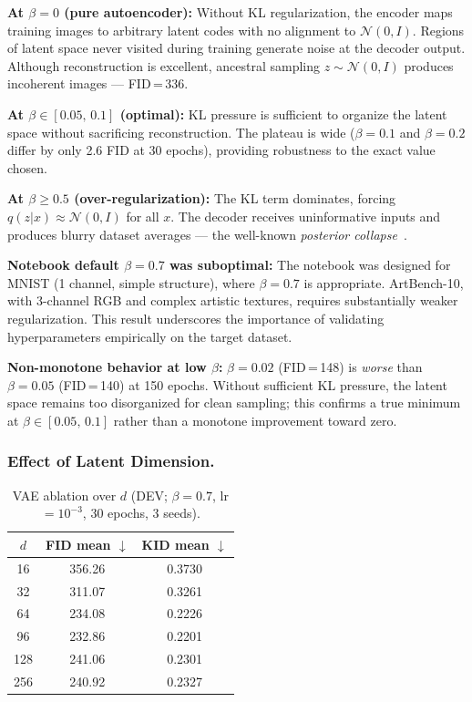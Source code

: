 \documentclass[runningheads]{llncs}
\begin{document}
\textbf{At $\beta=0$ (pure autoencoder):} Without KL regularization, the encoder maps training images to arbitrary latent codes with no alignment to $\mathcal{N}(0,I)$. Regions of latent space never visited during training generate noise at the decoder output. Although reconstruction is excellent, ancestral sampling $z\sim\mathcal{N}(0,I)$ produces incoherent images — FID\,=\,336.

\textbf{At $\beta \in [0.05,\,0.1]$ (optimal):} KL pressure is sufficient to organize the latent space without sacrificing reconstruction. The plateau is wide ($\beta=0.1$ and $\beta=0.2$ differ by only 2.6 FID at 30 epochs), providing robustness to the exact value chosen.

\textbf{At $\beta \geq 0.5$ (over-regularization):} The KL term dominates, forcing $q(z|x) \approx \mathcal{N}(0,I)$ for all $x$. The decoder receives uninformative inputs and produces blurry dataset averages — the well-known \emph{posterior collapse}~\cite{bowman2016}.

\textbf{Notebook default $\beta=0.7$ was suboptimal:} The notebook was designed for MNIST (1 channel, simple structure), where $\beta=0.7$ is appropriate. ArtBench-10, with 3-channel RGB and complex artistic textures, requires substantially weaker regularization. This result underscores the importance of validating hyperparameters empirically on the target dataset.

\textbf{Non-monotone behavior at low $\beta$:} $\beta=0.02$ (FID\,=\,148) is \emph{worse} than $\beta=0.05$ (FID\,=\,140) at 150 epochs. Without sufficient KL pressure, the latent space remains too disorganized for clean sampling; this confirms a true minimum at $\beta \in [0.05,\,0.1]$ rather than a monotone improvement toward zero.

\subsubsection{Effect of Latent Dimension.}

\begin{table}[htbp]
\caption{VAE ablation over $d$ (DEV; $\beta=0.7$, lr$=10^{-3}$, 30 epochs, 3 seeds).}\label{tab:vae_lat}
\centering
\begin{tabular}{ccc}
\toprule
$d$ & FID mean $\downarrow$ & KID mean $\downarrow$ \\
\midrule
16  & 356.26 & 0.3730 \\
32  & 311.07 & 0.3261 \\
64  & 234.08 & 0.2226 \\
96  & 232.86 & 0.2201 \\
128 & 241.06 & 0.2301 \\
256 & 240.92 & 0.2327 \\
\bottomrule
\end{tabular}
\end{table}
\end{document}
